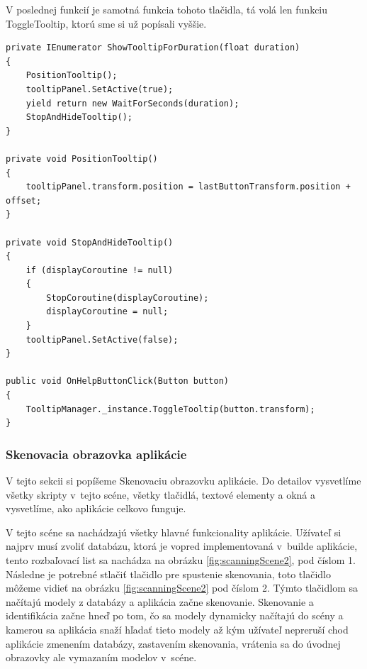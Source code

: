 V poslednej funkcií je samotná funkcia tohoto tlačidla, tá volá len funkciu ToggleTooltip, ktorú sme si už popísali vyššie.

\lstset{style=Csharp}
\begin{lstlisting}[caption={TooltipManager Class - Zobrazovanie vyskakovacieho pomocného poľa. Part 2}, label=tooltipManagerPart2]
private IEnumerator ShowTooltipForDuration(float duration)
{
    PositionTooltip();
    tooltipPanel.SetActive(true); 
    yield return new WaitForSeconds(duration); 
    StopAndHideTooltip(); 
}

private void PositionTooltip()
{
    tooltipPanel.transform.position = lastButtonTransform.position + offset;
}

private void StopAndHideTooltip()
{
    if (displayCoroutine != null)
    {
        StopCoroutine(displayCoroutine);
        displayCoroutine = null;
    }
    tooltipPanel.SetActive(false);
}

public void OnHelpButtonClick(Button button)
{
    TooltipManager._instance.ToggleTooltip(button.transform);
}
\end{lstlisting}

\subsubsection{Skenovacia obrazovka aplikácie}

V tejto sekcii si popíšeme Skenovaciu obrazovku aplikácie. Do detailov vysvetlíme všetky skripty v~tejto scéne, všetky tlačidlá, textové elementy a okná a vysvetlíme, ako aplikácie celkovo funguje. %



V tejto scéne sa nachádzajú všetky hlavné funkcionality aplikácie. Užívateľ si najprv musí zvoliť databázu, ktorá je vopred implementovaná v~builde aplikácie, tento rozbaľovací list sa nachádza na obrázku \ref{fig:scanningScene2}, pod číslom 1. Následne je potrebné stlačiť tlačidlo pre spustenie skenovania, toto tlačidlo môžeme vidieť na obrázku \ref{fig:scanningScene2} pod číslom 2. Týmto tlačidlom sa načítajú modely z databázy a aplikácia začne skenovanie. Skenovanie a identifikácia začne hneď po tom, čo sa modely dynamicky načítajú do scény a kamerou sa aplikácia snaží hľadať tieto modely až kým užívateľ nepreruší chod aplikácie zmenením databázy, zastavením skenovania, vrátenia sa do úvodnej obrazovky ale vymazaním modelov v~scéne. 

